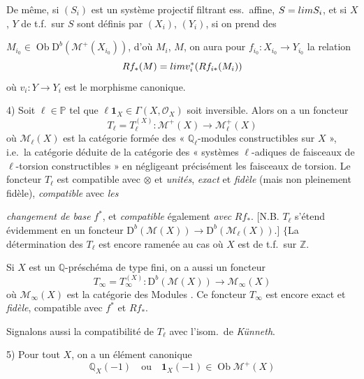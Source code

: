 \documentclass[11pt,a4paper]{article}
\begin{document}
De même, si $(S_{i})$ est un système projectif filtrant ess.\ affine,
$S = \varprojlim S_{i}$, et si $X$, $Y$ de t.f.\ sur $S$ sont
définis par $(X_{i})$, $(Y_{i})$, si on prend des

$M_{i_{0}} \in \operatorname{Ob} \mathrm{D}^{b}(\mathcal{M}^{+}(X_{i_{0}}))$,
d'où $M_{i}$, $M$, on aura pour $f_{i_{0}} : X_{i_{0}} \to Y_{i_{0}}$ la relation
\[
  Rf_{*}(M) = \varinjlim v_{i}^{*}(Rf_{i*}(M_{i}))
\]
où $v_{i} : Y \to Y_{i}$ est le morphisme canonique.

4) Soit $\ell \in \mathbb{P}$ tel que $\ell \mathbf{1}_{X} \in \Gamma(X,
\mathcal{O}_{X})$ soit inversible. Alors on a un foncteur
\[
  T_{\ell} = T_{\ell}^{(X)} : \mathcal{M}^{+}(X) \to \mathcal{M}^{+}_{\ell}(X)
\]
où $\mathcal{M}_{\ell}(X)$ est la catégorie formée des « $\mathbb{Q}_{\ell}$-modules
constructibles sur $X$ », i.e.\ la catégorie déduite de la catégorie des
« systèmes $\ell$-adiques de faisceaux de $\ell$-torsion
constructibles » en négligeant précisément les faisceaux de torsion. Le foncteur
$T_{\ell}$ est compatible avec $\otimes$ et \emph{unités}, \emph{exact} et
\emph{fidèle} (mais non pleinement fidèle), \emph{compatible} avec \emph{les}

\emph{changement de base} $f^{*}$, et \emph{compatible} également \emph{avec}
$Rf_{*}$. [N.B. $T_{\ell}$ s'étend évidemment en un foncteur
$\mathrm{D}^{b}(\mathcal{M}(X)) \to \mathrm{D}^{b}(\mathcal{M}_{\ell}(X))$.]
$\{$La détermination des $T_{\ell}$ est encore ramenée au cas où $X$ est de
t.f.\ sur $\mathbb{Z}$.

Si $X$ est un $\mathbb{Q}$-préschéma de type fini, on a aussi un foncteur
\[
  T_{\infty} = T_{\infty}^{(X)} : \mathrm{D}^{b}(\mathcal{M}(X)) \to \mathcal{M}_{\infty}(X)
\]
où $\mathcal{M}_{\infty}(X)$ est la catégorie des Modules \ill{}
. Ce foncteur $T_{\infty}$ est encore exact et
\emph{fidèle}, compatible avec $f^{*}$ et $Rf_{*}$.

Signalons aussi la compatibilité de $T_{\ell}$ avec l'isom.\ de
\emph{Künneth}.

5) Pour tout $X$, on a un \struck{\ill{}} élément canonique
\[
  \mathbb{Q}_{X}(-1) \quad\text{ou}\quad \mathbf{1}_{X}(-1) \in \operatorname{Ob} \mathcal{M}^{+}(X)
\]
\end{document}

